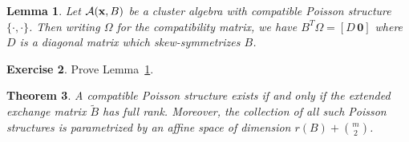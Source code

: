\documentclass{amsart}
\newtheorem{theorem}{Theorem}[section]
\newtheorem{lemma}[theorem]{Lemma}
\theoremstyle{definition}
\newtheorem{exercise}[theorem]{Exercise}
\theoremstyle{remark}
\numberwithin{equation}{section}
\newcommand{\cA}{{\mathcal{A}}}
\newcommand{\bx}{{\bf x}}
\begin{document}
  \begin{lemma}
  \label{le:compatibility}
    Let $\cA(\bx,B)$ be a cluster algebra with compatible Poisson structure $\{\cdot,\cdot\}$.  Then writing $\Omega$ for the compatibility matrix, we have $B^T\Omega=[D\, \boldsymbol{0}]$ where $D$ is a diagonal matrix which skew-symmetrizes $B$.
  \end{lemma}
  \begin{exercise}
    Prove Lemma~\ref{le:compatibility}. 
  \end{exercise}

  \begin{theorem}
    A compatible Poisson structure exists if and only if the extended exchange matrix $\tilde B$ has full rank.  Moreover, the collection of all such Poisson structures is parametrized by an affine space of dimension $r(B)+{m\choose 2}$.
  \end{theorem}
\end{document}
